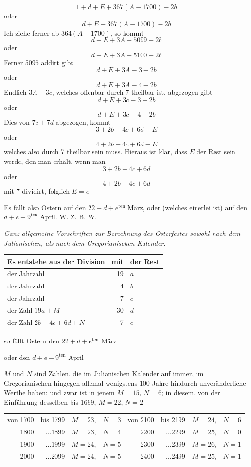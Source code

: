 %
\[
1+d+E+367(A-1700)-2b
\]
oder
\[
d+E+367(A-1700)-2b
\]
Ich ziehe ferner ab $364(A-1700)$, so kommt
\[
d+E+3A-5099-2b
\]
oder
\[
d+E+3A-5100-2b
\]
Ferner 5096 addirt gibt
\[
d+E+3A-3-2b
\]
oder
\[
d+E+3A-4-2b
\]
Endlich $3A-3c$, welches offenbar durch 7 theilbar ist, abgezogen gibt
\[
d+E+3c-3-2b
\]
oder
\[
d+E+3c-4-2b
\]
Dies von $7c+7d$ abgezogen, kommt
\[
3+2b+4c+6d-E
\]
oder
\[
4+2b+4c+6d-E
\]
welches also durch 7 theilbar sein muss. Hieraus ist klar, dass $E$ der Rest
sein werde, den man erhält, wenn man
\[
3+2b+4c+6d
\]
oder
\[
4+2b+4c+6d
\]
mit 7 dividirt, folglich $E=e$.

Es fällt also Ostern auf den $22+d+e^{\mathrm{ten}}$ März, oder (welches einerlei ist)
auf den $d+e-9^{\mathrm{ten}}$ April. W. Z. B. W.

%
\begin{center}\textit{Ganz allgemeine Vorschriften zur Berechnung des Osterfestes
sowohl nach dem Julianischen, als nach dem Gregorianischen Kalender.}\end{center}
\begin{center}
\begin{tabular}{l|r|l}
Es entstehe aus der Division & mit & der Rest\\\hline
der Jahrzahl & 19 & $a$\\
der Jahrzahl & 4 & $b$\\
der Jahrzahl & 7 & $c$\\
der Zahl $19a+M$ & 30 & $d$\\
der Zahl $2b+4c+6d+N$ & 7 & $e$\\\hline
\end{tabular}\par
so fällt Ostern den $22+d+e^{\mathrm{ten}}$ März\par
oder den $d+e-9^{\mathrm{ten}}$ April
\end{center}

$M$ und $N$ sind Zahlen, die im Julianischen Kalender auf immer, im Gregorianischen
hingegen allemal wenigstens 100 Jahre hindurch unveränderliche
Werthe haben; und zwar ist in jenem $M=15$, $N=6$; in diesem, von der Einführung
desselben bis 1699, $M=22$, $N=2$
\begin{center}\small
\setlength{\tabcolsep}{5pt}\begin{tabular}{rrll|rrll}
von 1700 & bis 1799 & $M=23$, & $N=3$ & von 2100 & bis 2199 & $M=24$, & $N=6$\\
1800 & $\ldots$1899 & $M=23$, & $N=4$ & 2200 & $\ldots$2299 & $M=25$, & $N=0$\\
1900 & $\ldots$1999 & $M=24$, & $N=5$ & 2300 & $\ldots$2399 & $M=26$, & $N=1$\\
2000 & $\ldots$2099 & $M=24$, & $N=5$ & 2400 & $\ldots$2499 & $M=25$, & $N=1$
\end{tabular}
\end{center}

